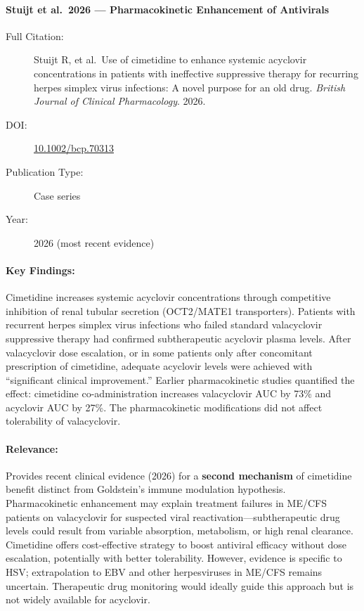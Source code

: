 \paragraph{Stuijt et al.\ 2026 --- Pharmacokinetic Enhancement of Antivirals}

\begin{description}
    \item[Full Citation:] Stuijt R, et al.\ Use of cimetidine to enhance systemic acyclovir concentrations in patients with ineffective suppressive therapy for recurring herpes simplex virus infections: A novel purpose for an old drug. \textit{British Journal of Clinical Pharmacology}. 2026.
    \item[DOI:] \href{https://doi.org/10.1002/bcp.70313}{10.1002/bcp.70313}
    \item[Publication Type:] Case series
    \item[Year:] 2026 (most recent evidence)
\end{description}

\paragraph{Key Findings:}
Cimetidine increases systemic acyclovir concentrations through competitive inhibition of renal tubular secretion (OCT2/MATE1 transporters). Patients with recurrent herpes simplex virus infections who failed standard valacyclovir suppressive therapy had confirmed subtherapeutic acyclovir plasma levels. After valacyclovir dose escalation, or in some patients only after concomitant prescription of cimetidine, adequate acyclovir levels were achieved with ``significant clinical improvement.'' Earlier pharmacokinetic studies quantified the effect: cimetidine co-administration increases valacyclovir AUC by 73\% and acyclovir AUC by 27\%. The pharmacokinetic modifications did not affect tolerability of valacyclovir.

\paragraph{Relevance:}
Provides recent clinical evidence (2026) for a \textbf{second mechanism} of cimetidine benefit distinct from Goldstein's immune modulation hypothesis. Pharmacokinetic enhancement may explain treatment failures in ME/CFS patients on valacyclovir for suspected viral reactivation---subtherapeutic drug levels could result from variable absorption, metabolism, or high renal clearance. Cimetidine offers cost-effective strategy to boost antiviral efficacy without dose escalation, potentially with better tolerability. However, evidence is specific to HSV; extrapolation to EBV and other herpesviruses in ME/CFS remains uncertain. Therapeutic drug monitoring would ideally guide this approach but is not widely available for acyclovir.

